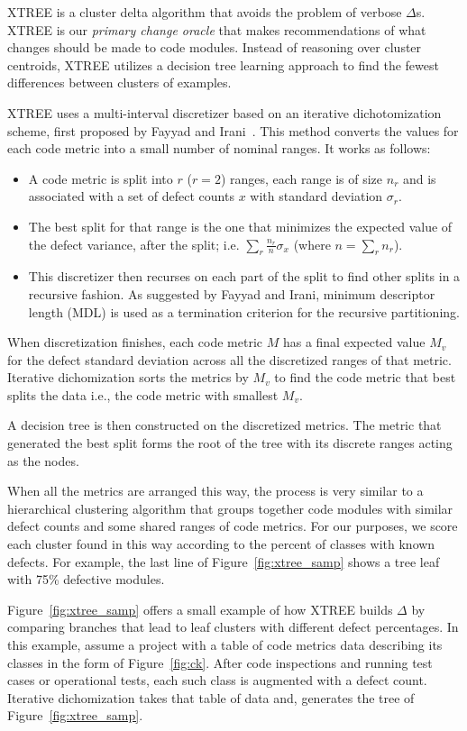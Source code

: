 \documentclass[twocolumn,5p]{elsarticle}
\newcommand{\fig}[1]{Figure~\ref{fig:#1}}
\theoremstyle{break}
\begin{document}
	XTREE  is a cluster delta algorithm
	that avoids the problem of verbose $\Delta$s.
	XTREE is our {\em primary change oracle} that makes recommendations 
	of what changes should be made to code modules.
	Instead of reasoning over cluster centroids,
	XTREE utilizes a decision tree learning approach
	to find the fewest differences between clusters of examples.
	
	
	XTREE uses a multi-interval discretizer based on an iterative dichotomization scheme, first proposed by Fayyad and Irani~\cite{fi}. This method converts the values for each code metric into a small number of nominal ranges. It works as follows:
	\begin{itemize}
		\item A code metric is split into $r$ ($r=2$) ranges, each range is of
		size $n_r$ and is associated with a set of defect counts $x$ with standard deviation
		$\sigma_r$. 
		\item The best split for that range is the one that minimizes the expected value of the
		defect variance, after the split; i.e. $\sum_r\frac{n_r}{n}\sigma_x$ (where $n=\sum_r n_r$). 
		\item This discretizer then recurses on each part of the split to find other splits in a recursive fashion. As suggested by Fayyad and Irani, minimum descriptor length (MDL) is used as a termination criterion for the recursive partitioning.
	\end{itemize}
	
	When discretization finishes, each code metric $M$ has a 
	final expected value $M_v$ for the defect standard deviation 
	across all the discretized ranges of that metric.
	Iterative dichomization sorts the metrics by $M_v$
	to find the code metric that best splits the data i.e., the code metric with smallest $M_v$. 
	
	A decision tree is then constructed on the discretized metrics. The metric that generated the best split forms the root of the tree with its discrete ranges acting as the nodes. 
	
	When all the metrics are arranged this way, the process is very similar to a hierarchical clustering algorithm that groups together code modules with similar defect counts and some shared ranges of code metrics.
	For our purposes, we score each cluster found in this way according
	to the percent of classes with known defects. For example, the last line of \fig{xtree_samp} shows a tree leaf with 75\%
	defective modules.
	
	\fig{xtree_samp} offers
	a small example of how XTREE builds
	$\Delta$ by comparing branches that lead to leaf clusters
	with different defect percentages. In this example, assume a project with a table of code metrics data describing its classes in the form of \fig{ck}. After code inspections and running test cases or operational
	tests, each such class is augmented with a defect count.
	Iterative dichomization takes that table of data and, 
	generates the tree of \fig{xtree_samp}.
	
\end{document}
